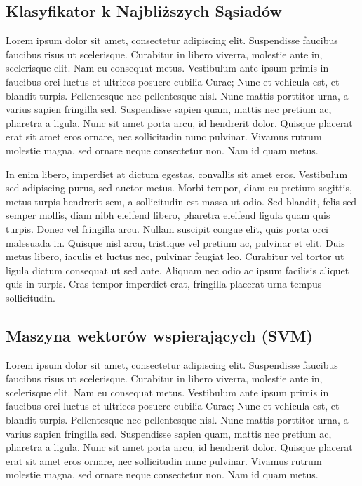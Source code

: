 	\subsection{Klasyfikator k Najbliższych Sąsiadów}
	Lorem ipsum dolor sit amet, consectetur adipiscing elit. Suspendisse faucibus faucibus risus ut scelerisque. Curabitur in libero viverra, molestie ante in, scelerisque elit. Nam eu consequat metus. Vestibulum ante ipsum primis in faucibus orci luctus et ultrices posuere cubilia Curae; Nunc et vehicula est, et blandit turpis. Pellentesque nec pellentesque nisl. Nunc mattis porttitor urna, a varius sapien fringilla sed. Suspendisse sapien quam, mattis nec pretium ac, pharetra a ligula. Nunc sit amet porta arcu, id hendrerit dolor. Quisque placerat erat sit amet eros ornare, nec sollicitudin nunc pulvinar. Vivamus rutrum molestie magna, sed ornare neque consectetur non. Nam id quam metus.

	In enim libero, imperdiet at dictum egestas, convallis sit amet eros. Vestibulum sed adipiscing purus, sed auctor metus. Morbi tempor, diam eu pretium sagittis, metus turpis hendrerit sem, a sollicitudin est massa ut odio. Sed blandit, felis sed semper mollis, diam nibh eleifend libero, pharetra eleifend ligula quam quis turpis. Donec vel fringilla arcu. Nullam suscipit congue elit, quis porta orci malesuada in. Quisque nisl arcu, tristique vel pretium ac, pulvinar et elit. Duis metus libero, iaculis et luctus nec, pulvinar feugiat leo. Curabitur vel tortor ut ligula dictum consequat ut sed ante. Aliquam nec odio ac ipsum facilisis aliquet quis in turpis. Cras tempor imperdiet erat, fringilla placerat urna tempus sollicitudin.

	\subsection{Maszyna wektorów wspierających (SVM)}
	Lorem ipsum dolor sit amet, consectetur adipiscing elit. Suspendisse faucibus faucibus risus ut scelerisque. Curabitur in libero viverra, molestie ante in, scelerisque elit. Nam eu consequat metus. Vestibulum ante ipsum primis in faucibus orci luctus et ultrices posuere cubilia Curae; Nunc et vehicula est, et blandit turpis. Pellentesque nec pellentesque nisl. Nunc mattis porttitor urna, a varius sapien fringilla sed. Suspendisse sapien quam, mattis nec pretium ac, pharetra a ligula. Nunc sit amet porta arcu, id hendrerit dolor. Quisque placerat erat sit amet eros ornare, nec sollicitudin nunc pulvinar. Vivamus rutrum molestie magna, sed ornare neque consectetur non. Nam id quam metus.

